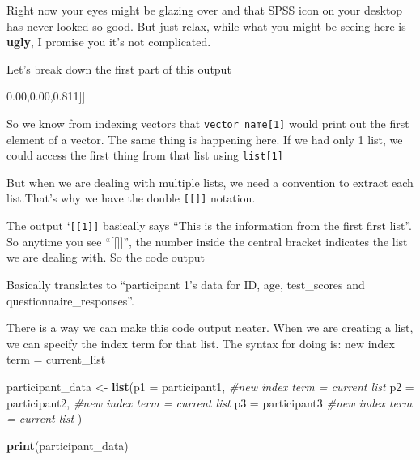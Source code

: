 \documentclass[
]{book}
\newenvironment{Shaded}{\begin{snugshade}}{\end{snugshade}}
\newcommand{\AttributeTok}[1]{\textcolor[rgb]{0.13,0.29,0.53}{#1}}
\newcommand{\CommentTok}[1]{\textcolor[rgb]{0.56,0.35,0.01}{\textit{#1}}}
\newcommand{\DecValTok}[1]{\textcolor[rgb]{0.00,0.00,0.81}{#1}}
\newcommand{\FunctionTok}[1]{\textcolor[rgb]{0.13,0.29,0.53}{\textbf{#1}}}
\newcommand{\NormalTok}[1]{#1}
\newcommand{\OtherTok}[1]{\textcolor[rgb]{0.56,0.35,0.01}{#1}}
\newcommand{\SpecialCharTok}[1]{\textcolor[rgb]{0.81,0.36,0.00}{\textbf{#1}}}
\begin{document}
Right now your eyes might be glazing over and that SPSS icon on your desktop has never looked so good. But just relax, while what you might be seeing here is \textbf{ugly}, I promise you it's not complicated.

Let's break down the first part of this output

\begin{Shaded}
\begin{Highlighting}[]
\NormalTok{[[}\DecValTok{1}\NormalTok{]]}
\end{Highlighting}
\end{Shaded}

So we know from indexing vectors that \texttt{vector\_name{[}1{]}} would print out the first element of a vector. The same thing is happening here. If we had only 1 list, we could access the first thing from that list using \texttt{list{[}1{]}}

But when we are dealing with multiple lists, we need a convention to extract each list.That's why we have the double \texttt{{[}{[}{]}{]}} notation.

The output `\texttt{{[}{[}1{]}{]}} basically says ``This is the information from the first first list''. So anytime you see ``{[}{[}{]}{]}'', the number inside the central bracket indicates the list we are dealing with. So the code output

\begin{Shaded}
\end{Shaded}

Basically translates to ``participant 1's data for ID, age, test\_scores and questionnaire\_responses''.

There is a way we can make this code output neater. When we are creating a list, we can specify the index term for that list. The syntax for doing is: new index term = current\_list

\begin{Shaded}
\begin{Highlighting}[]
\NormalTok{participant\_data }\OtherTok{\textless{}{-}} \FunctionTok{list}\NormalTok{(}\AttributeTok{p1 =}\NormalTok{ participant1, }\CommentTok{\#new index term = current list}
                         \AttributeTok{p2 =}\NormalTok{ participant2, }\CommentTok{\#new index term = current list}
                         \AttributeTok{p3 =}\NormalTok{ participant3 }\CommentTok{\#new index term = current list}
\NormalTok{                         )}

\FunctionTok{print}\NormalTok{(participant\_data)}
\end{Highlighting}
\end{Shaded}
\end{document}
